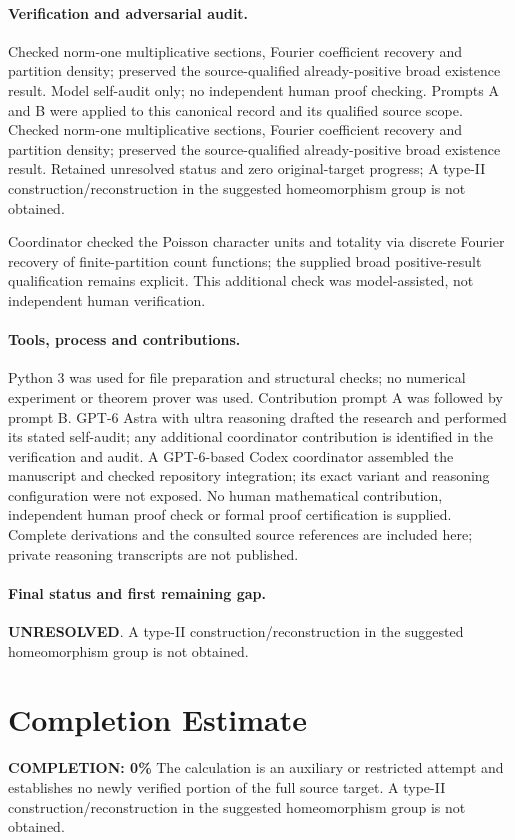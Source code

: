 \documentclass[11pt]{article}
\begin{document}
\paragraph{Verification and adversarial audit.}
Checked norm-one multiplicative sections, Fourier coefficient recovery and partition density; preserved the source-qualified already-positive broad existence result. Model self-audit only; no independent human proof checking. Prompts A and B were applied to this canonical record and its qualified source scope. Checked norm-one multiplicative sections, Fourier coefficient recovery and partition density; preserved the source-qualified already-positive broad existence result. Retained unresolved status and zero original-target progress; A type-II construction/reconstruction in the suggested homeomorphism group is not obtained.

Coordinator checked the Poisson character units and totality via discrete Fourier recovery of finite-partition count functions; the supplied broad positive-result qualification remains explicit. This additional check was model-assisted, not independent human verification.

\paragraph{Tools, process and contributions.}
Python 3 was used for file preparation and structural checks; no numerical experiment or theorem prover was used. Contribution prompt A was followed by prompt B. GPT-6 Astra with ultra reasoning drafted the research and performed its stated self-audit; any additional coordinator contribution is identified in the verification and audit. A GPT-6-based Codex coordinator assembled the manuscript and checked repository integration; its exact variant and reasoning configuration were not exposed. No human mathematical contribution, independent human proof check or formal proof certification is supplied. Complete derivations and the consulted source references are included here; private reasoning transcripts are not published.

\paragraph{Final status and first remaining gap.}
\textbf{UNRESOLVED}. A type-II construction/reconstruction in the suggested homeomorphism group is not obtained.

\section{Completion Estimate}
\noindent\textbf{COMPLETION: 0\%}
The calculation is an auxiliary or restricted attempt and establishes no newly verified portion of the full source target. A type-II construction/reconstruction in the suggested homeomorphism group is not obtained.
\end{document}
